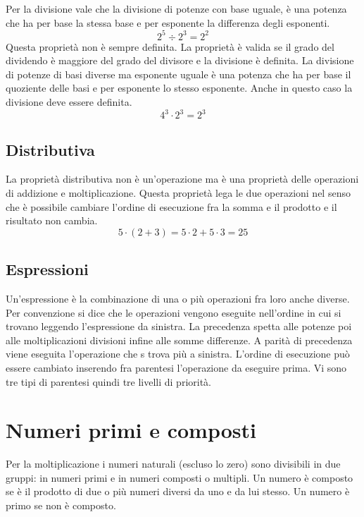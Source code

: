Per la divisione vale che la divisione di potenze con base uguale, è una potenza che ha per base la stessa base e per esponente la differenza degli esponenti.\[ 2^5\div 2^3=2^2 \]Questa proprietà non è sempre definita. La proprietà è valida se il grado del dividendo è maggiore del grado del divisore e la divisione è definita.  La divisione di potenze di basi diverse ma esponente uguale è una potenza che ha per base il quoziente delle basi e per esponente lo stesso esponente. Anche in questo caso la divisione deve essere definita.\[4^3\cdot 2^3=2^3\] 
\subsection{Distributiva}
\label{sec:distibutivaInN}
La proprietà distributiva non è un'operazione ma è una proprietà delle operazioni di addizione e moltiplicazione. Questa proprietà lega le due operazioni nel senso che è possibile cambiare l'ordine di esecuzione fra la somma e il prodotto e il risultato non cambia. \[ 5\cdot(2+3)=5\cdot 2+ 5\cdot 3=25\]
\subsection{Espressioni}
\label{sec:EspressioniNumeri Naturali}
Un'espressione è la combinazione di una o più operazioni fra loro anche diverse. Per convenzione si dice che le operazioni vengono eseguite nell'ordine in cui si trovano leggendo l'espressione da sinistra. La precedenza spetta alle potenze poi alle moltiplicazioni divisioni infine alle somme differenze. A parità di precedenza viene eseguita l'operazione che s trova più a sinistra. L'ordine di esecuzione può essere  cambiato inserendo fra parentesi l'operazione da eseguire prima. Vi sono tre tipi di parentesi quindi tre livelli di priorità.
\section{Numeri primi e composti}
\label{sec:Numeriprimiecomposti}
Per la moltiplicazione i numeri naturali (escluso lo zero) sono divisibili in due gruppi: in numeri primi e in numeri composti o multipli. Un numero è composto se è il prodotto di due o più numeri diversi da uno e da lui stesso. Un numero è primo se non è composto. 

